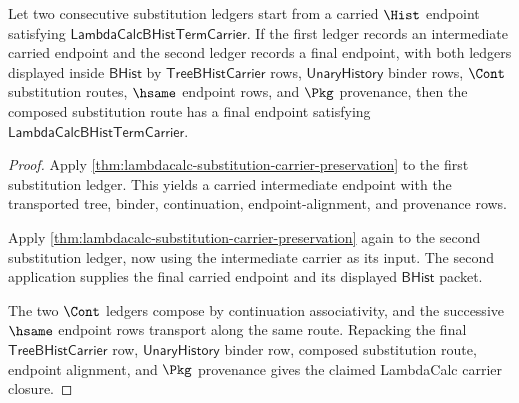 \begin{theorem}
\label{thm:lambdacalc-substitution-composition-carrier-closure}
Let two consecutive substitution ledgers start from a carried $\Hist$ endpoint
satisfying $\mathsf{LambdaCalcBHistTermCarrier}$. If the first ledger records
an intermediate carried endpoint and the second ledger records a final endpoint,
with both ledgers displayed inside $\mathsf{BHist}$ by
$\mathsf{TreeBHistCarrier}$ rows, $\mathsf{UnaryHistory}$ binder rows,
$\Cont$ substitution routes, $\hsame$ endpoint rows, and $\Pkg$ provenance,
then the composed substitution route has a final endpoint satisfying
$\mathsf{LambdaCalcBHistTermCarrier}$.
\end{theorem}
\begin{proof}
Apply
\autoref{thm:lambdacalc-substitution-carrier-preservation} to the first
substitution ledger. This yields a carried intermediate endpoint with the
transported tree, binder, continuation, endpoint-alignment, and provenance
rows.

Apply
\autoref{thm:lambdacalc-substitution-carrier-preservation} again to the second
substitution ledger, now using the intermediate carrier as its input. The
second application supplies the final carried endpoint and its displayed
$\mathsf{BHist}$ packet.

The two $\Cont$ ledgers compose by continuation associativity, and the
successive $\hsame$ endpoint rows transport along the same route. Repacking the
final $\mathsf{TreeBHistCarrier}$ row, $\mathsf{UnaryHistory}$ binder row,
composed substitution route, endpoint alignment, and $\Pkg$ provenance gives
the claimed LambdaCalc carrier closure.
\end{proof}

